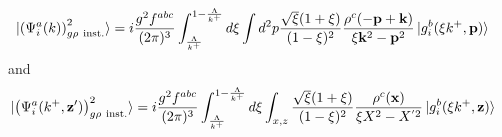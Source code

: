 \documentclass[aps,prd,amsmath,amssymb,nofootinbib]{revtex4-2}
\def\v#1{\mathbf{#1}}
\numberwithin{equation}{section}
\begin{document}
\begin{align}\label{oneginst2}
  \ket{ \left(\Psi^{a}_{i}(k) \right)^{2}_{g \rho\ {\rm inst.} } }%
   &= i \frac{g^2 f^{abc}}{(2\pi)^3} 
   \int_{\frac{\Lambda}{k^{+}}}^{1-\frac{\Lambda} {k^{+}}} d \xi %
   \int d^2p %
   \frac{\sqrt{\xi} (1+\xi) } {(1-\xi)^2} \frac{\rho^c(-\v{p}+\v{k})}{\xi \v{k}^2 - \v{p}^2} 
   \ket{g_{i}^{b}(\xi k^+,\v{p})} 
\end{align}
and 
\begin{align}%
 \label{Eq:onegluoninstX2}
  \ket{ \left(\Psi^{a}_{i}(k^+, \v{z}') \right)^{2}_{g \rho\ {\rm inst.} } }%
   &= 
   i \frac{g^2 f^{abc}}{(2\pi)^3} \int_{ \frac{\Lambda}{k^+}   }^{ 1- \frac{\Lambda  }{k^+} } %
   d \xi \int_{x,z} %
   \frac{\sqrt{\xi} (1+\xi) } {(1-\xi)^2} \frac{\rho^c(\v{x})}{\xi X^{2} - X^{'2} } 
   \ket{g_{i}^{b}(\xi k^+,\v{z})} 
\end{align}
\end{document}
